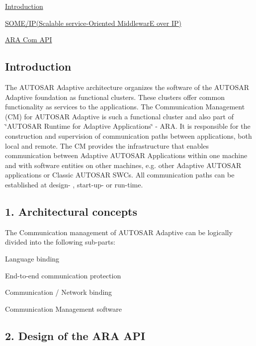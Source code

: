 \begin{DoxyItemize}
\item \hyperlink{adaptive_communicationmanagement_introduction}{Introduction}
\item \hyperlink{adaptive_communicationmanagement_someip}{S\+O\+M\+E/\+IP(Scalable service-\/\+Oriented MiddlewarE over IP)}
\item \hyperlink{adaptive_communicationmanagement_aracom}{A\+RA Com A\+PI} 
\end{DoxyItemize}\hypertarget{adaptive_communicationmanagement_introduction}{}\subsection{Introduction}\label{adaptive_communicationmanagement_introduction}
The A\+U\+T\+O\+S\+AR Adaptive architecture organizes the software of the A\+U\+T\+O\+S\+AR Adaptive foundation as functional clusters. These clusters offer common functionality as services to the applications. The Communication Management (CM) for A\+U\+T\+O\+S\+AR Adaptive is such a functional cluster and also part of \char`\"{}\+A\+U\+T\+O\+S\+A\+R Runtime for Adaptive Applications\char`\"{} -\/ A\+RA. It is responsible for the construction and supervision of communication paths between applications, both local and remote. The CM provides the infrastructure that enables communication between Adaptive A\+U\+T\+O\+S\+AR Applications within one machine and with software entities on other machines, e.\+g. other Adaptive A\+U\+T\+O\+S\+AR applications or Classic A\+U\+T\+O\+S\+AR S\+W\+Cs. All communication paths can be established at design-\/ , start-\/up-\/ or run-\/time.

 \subsection*{1. Architectural concepts}

The Communication management of A\+U\+T\+O\+S\+AR Adaptive can be logically divided into the following sub-\/parts\+:
\begin{DoxyEnumerate}
\item Language binding
\item End-\/to-\/end communication protection
\item Communication / Network binding
\item Communication Management software
\end{DoxyEnumerate}

\subsection*{2. Design of the A\+RA A\+PI}


